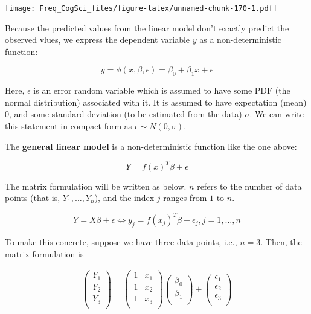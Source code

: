 \documentclass[12pt,]{krantz}
\begin{document}
\texttt{[image: Freq\_CogSci\_files/figure-latex/unnamed-chunk-170-1.pdf]}

Because the predicted values from the linear model don't exactly predict the observed vlues, we express the dependent variable \(y\) as a non-deterministic function:

\begin{equation}
y=\phi(x,\beta,\epsilon)=\beta_0+\beta_1x+\epsilon
\end{equation}

Here, \(\epsilon\) is an error random variable which is assumed to have some PDF (the normal distribution) associated with it.
It is assumed to have expectation (mean) 0, and some standard deviation (to be estimated from the data) \(\sigma\).
We can write this statement in compact form as \(\epsilon \sim N(0,\sigma)\).

The \textbf{general linear model} is a non-deterministic function like the one above:

\begin{equation}
Y=f(x)^T\beta +\epsilon 
\end{equation}

The matrix formulation will be written as below. \(n\) refers to the number of data points (that is, \(Y_1,\dots,Y_n\)), and the index \(j\) ranges from \(1\) to \(n\).

\begin{equation}
Y = X\beta + \epsilon \Leftrightarrow y_j = f(x_j)^T \beta + \epsilon_j, j=1,\dots,n
\end{equation}

To make this concrete, suppose we have three data points, i.e., \(n=3\). Then, the matrix formulation is

\begin{equation}
\begin{split}
\begin{pmatrix}
Y_1 \\
Y_2\\
Y_3 \\
\end{pmatrix}
=
\begin{pmatrix}
1 & x_1 \\
1 & x_2 \\
1 & x_3 \\
\end{pmatrix}
\begin{pmatrix}
\beta_0 \\
\beta_1 \\
\end{pmatrix}+ 
\begin{pmatrix}
\epsilon_1 \\
\epsilon_2 \\
\epsilon_3 \\
\end{pmatrix}\\
\end{split}
\end{equation}
\end{document}
